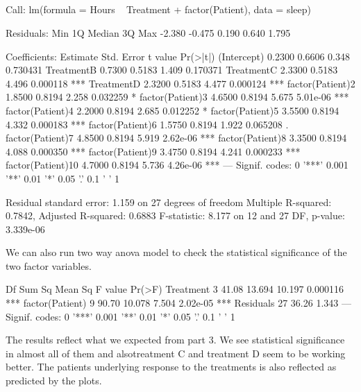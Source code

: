 \documentclass{article}
\begin{document}
\subsection{}
\begin{Schunk}
\begin{Soutput}
Call:
lm(formula = Hours ~ Treatment + factor(Patient), data = sleep)

Residuals:
   Min     1Q Median     3Q    Max 
-2.380 -0.475  0.190  0.640  1.795 

Coefficients:
                  Estimate Std. Error t value Pr(>|t|)    
(Intercept)         0.2300     0.6606   0.348 0.730431    
TreatmentB          0.7300     0.5183   1.409 0.170371    
TreatmentC          2.3300     0.5183   4.496 0.000118 ***
TreatmentD          2.3200     0.5183   4.477 0.000124 ***
factor(Patient)2    1.8500     0.8194   2.258 0.032259 *  
factor(Patient)3    4.6500     0.8194   5.675 5.01e-06 ***
factor(Patient)4    2.2000     0.8194   2.685 0.012252 *  
factor(Patient)5    3.5500     0.8194   4.332 0.000183 ***
factor(Patient)6    1.5750     0.8194   1.922 0.065208 .  
factor(Patient)7    4.8500     0.8194   5.919 2.62e-06 ***
factor(Patient)8    3.3500     0.8194   4.088 0.000350 ***
factor(Patient)9    3.4750     0.8194   4.241 0.000233 ***
factor(Patient)10   4.7000     0.8194   5.736 4.26e-06 ***
---
Signif. codes:  0 '***' 0.001 '**' 0.01 '*' 0.05 '.' 0.1 ' ' 1

Residual standard error: 1.159 on 27 degrees of freedom
Multiple R-squared:  0.7842,	Adjusted R-squared:  0.6883 
F-statistic: 8.177 on 12 and 27 DF,  p-value: 3.339e-06
\end{Soutput}
\end{Schunk}
We can also run two way anova model to check the statistical significance of the two factor variables.

\begin{Schunk}
\begin{Soutput}
                Df Sum Sq Mean Sq F value   Pr(>F)    
Treatment        3  41.08  13.694  10.197 0.000116 ***
factor(Patient)  9  90.70  10.078   7.504 2.02e-05 ***
Residuals       27  36.26   1.343                     
---
Signif. codes:  0 '***' 0.001 '**' 0.01 '*' 0.05 '.' 0.1 ' ' 1
\end{Soutput}
\end{Schunk}

The results reflect what we expected from part 3. We see statistical significance in almost all of them and alsotreatment C and treatment D seem to be working better. The patients underlying response to the treatments is also reflected as predicted by the plots.
\end{document}
